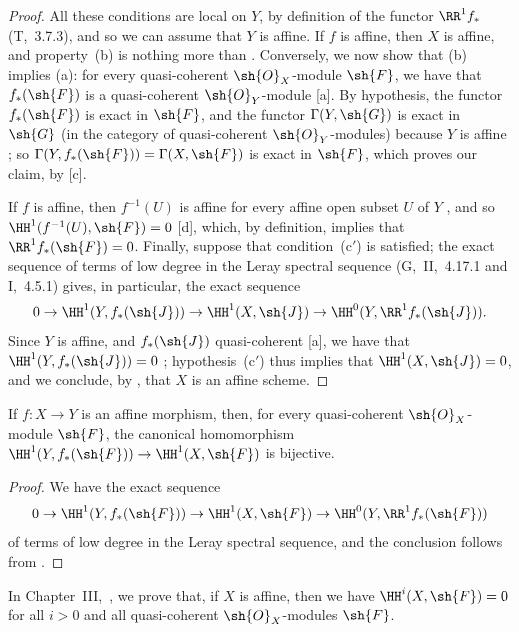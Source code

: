 \begin{proof}
All these conditions are local on $Y$, by definition of the functor $\RR^1 f_*$ (T,~3.7.3), and so we can assume that $Y$ is affine.
If $f$ is affine, then $X$ is affine, and property~(b) is nothing more than .
Conversely, we now show that (b) implies (a):
for every quasi-coherent $\sh{O}_X$-module $\sh{F}$, we have that $f_*(\sh{F})$ is a quasi-coherent $\sh{O}_Y$-module [a].
By hypothesis, the functor $f_*(\sh{F})$ is exact in $\sh{F}$, and the functor $\Gamma(Y,\sh{G})$ is exact in $\sh{G}$ (in the category of quasi-coherent $\sh{O}_Y$-modules) because $Y$ is affine ;
so $\Gamma(Y,f_*(\sh{F}))=\Gamma(X,\sh{F})$ is exact in $\sh{F}$, which proves our claim, by [c].

If $f$ is affine, then $f^{-1}(U)$ is affine for every affine open subset $U$ of $Y$ , and so $\HH^1(f^{-1}(U),\sh{F})=0$ [d], which, by definition, implies that $\RR^1 f_*(\sh{F})=0$.
Finally, suppose that condition~(c$'$) is satisfied;
the exact sequence of terms of low degree in the Leray spectral sequence (G,~II,~4.17.1 and I,~4.5.1) gives, in particular, the exact sequence
\[
  0\to\HH^1(Y,f_*(\sh{J}))\to\HH^1(X,\sh{J})\to\HH^0(Y,\RR^1 f_*(\sh{J})).
\]
Since $Y$ is affine, and $f_*(\sh{J})$ quasi-coherent [a], we have that $\HH^1(Y,f_*(\sh{J}))=0$ ;
hypothesis~(c$'$) thus implies that $\HH^1(X,\sh{J})=0$, and we conclude, by , that $X$ is an affine scheme.
\end{proof}

\begin{corollary}[5.2.3]
\label{II.5.2.3}
If $f:X\to Y$ is an affine morphism, then, for every quasi-coherent $\sh{O}_X$-module $\sh{F}$, the canonical homomorphism $\HH^1(Y,f_*(\sh{F}))\to\HH^1(X,\sh{F})$ is bijective.
\end{corollary}

\begin{proof}
We have the exact sequence
\[
  0\to\HH^1(Y,f_*(\sh{F}))\to\HH^1(X,\sh{F})\to\HH^0(Y,\RR^1 f_*(\sh{F}))
\]
of terms of low degree in the Leray spectral sequence, and the conclusion follows from .
\end{proof}

\begin{remark}[5.2.4]
\label{II.5.2.4}
In Chapter~III,~, we prove that, if $X$ is affine, then we have $\HH^i(X,\sh{F})=0$ for all $i>0$ and all quasi-coherent $\sh{O}_X$-modules $\sh{F}$.
\end{remark}

